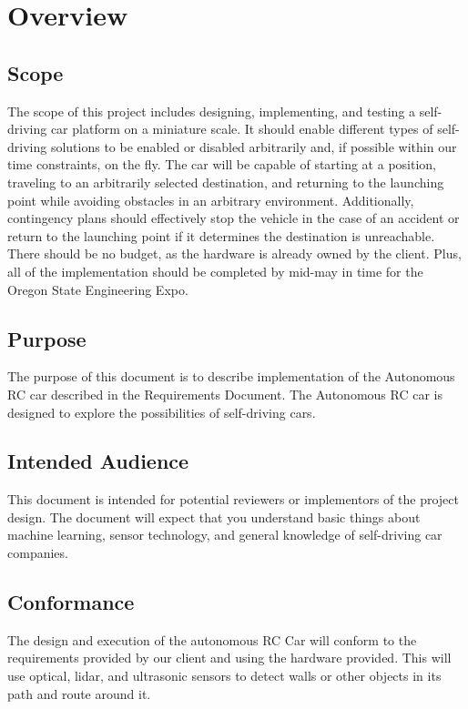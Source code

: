\documentclass[onecolumn, draftclsnofoot, 10pt, compsoc]{IEEEtran}
\begin{document}
\clearpage

\section{Overview}

\subsection{Scope}

The scope of this project includes designing, implementing, and testing a self-driving car platform on a miniature scale. It should enable different types of self-driving solutions to be enabled or disabled arbitrarily and, if possible within our time constraints, on the fly. The car will be capable of starting at a position, traveling to an arbitrarily selected destination, and returning to the launching point while avoiding obstacles in an arbitrary environment. Additionally, contingency plans should effectively stop the vehicle in the case of an accident or return to the launching point if it determines the destination is unreachable. There should be no budget, as the hardware is already owned by the client. Plus, all of the implementation should be completed by mid-may in time for the Oregon State Engineering Expo.

\subsection{Purpose}

The purpose of this document is to describe implementation of the Autonomous RC car described in the Requirements Document. The Autonomous RC car is designed to explore the possibilities of self-driving cars.

\subsection{Intended Audience}

This document is intended for potential reviewers or implementors of the project design. The document will expect that you understand basic things about machine learning, sensor technology, and general knowledge of self-driving car companies. 

\subsection{Conformance}

The design and execution of the autonomous RC Car will conform to the requirements provided by our client and using the hardware provided. This will use optical, lidar, and ultrasonic sensors to detect walls or other objects in its path and route around it.
\end{document}
